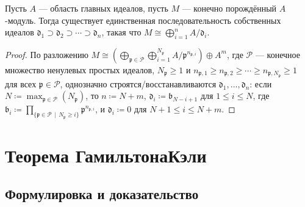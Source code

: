 \documentclass[
	extrafontsizes,
	11pt,
	hyphens,
]{memoir}
\begin{document}
\begin{corollary}
Пусть \(A\) --- область главных идеалов, пусть \(M\) --- конечно порождённый \(A\)-модуль. Тогда существует единственная последовательность собственных идеалов \(\mathfrak{d}_1 \supset \mathfrak{d}_2 \supset \cdots{} \supset \mathfrak{d}_n\), такая что \(M \cong \bigoplus_{i=1}^n A / \mathfrak{d}_i\).
\end{corollary}

\begin{proof}
По разложению
\(
M \cong (\bigoplus_{\mathfrak{p} \in \mathcal{P}} \bigoplus_{i = 1}^{N_\mathfrak{p}} A/{\mathfrak{p}}^{n_{\mathfrak{p},i}}) \oplus A^m
\),
где \(\mathcal{P}\) --- конечное множество ненулевых простых идеалов,
\(N_\mathfrak{p} \geq 1\) и \(n_{\mathfrak{p},1} \geq n_{\mathfrak{p},2} \geq \cdots \geq n_{\mathfrak{p},N_\mathfrak{p}} \geq 1\) для всех \(\mathfrak{p} \in \mathcal{P}\),
однозначно строятся/вос\-ста\-нав\-ли\-ва\-ют\-ся \(\mathfrak{d}_1, \dots{}, \mathfrak{d}_n\):
если \(N \coloneqq \max_{\mathfrak{p} \in \mathcal{P}}(N_\mathfrak{p})\), то
\(n \coloneqq N + m\),
\(\mathfrak{d}_i \coloneqq \mathfrak{b}_{N-i+1}\) для \(1 \leq i \leq N\), где
\(\mathfrak{b}_i \coloneqq \prod_{\{\mathfrak{p} \in \mathcal{P} \,\mid\, N_\mathfrak{p} \geq i\}} \mathfrak{p}^{n_{\mathfrak{p},i}}\),
и \(\mathfrak{d}_i \coloneqq 0\) для \(N+1 \leq i \leq N+m\).
\end{proof}


\section{Теорема Гамильтона\namedash{}Кэли}

\subsection{Формулировка и доказательство}
\end{document}
